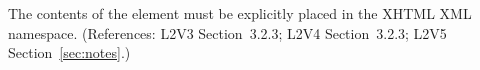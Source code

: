 The contents of the  element must be explicitly placed in the
XHTML XML namespace.  (References: L2V3 Section~3.2.3; L2V4 Section~3.2.3; L2V5 Section~\ref{sec:notes}.)
